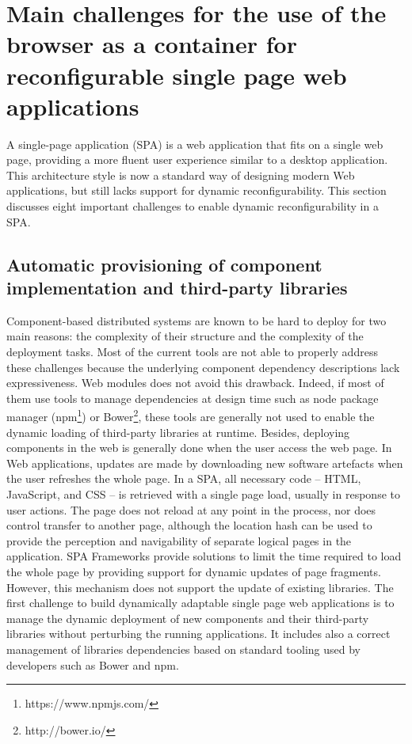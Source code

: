 \section{Main challenges for the use of the browser as a container for reconfigurable single page web applications }
A single-page application (SPA) is a web application that fits on a single web page, providing a more fluent user experience similar to a desktop application.
This architecture style is now a standard way of designing modern Web applications, but still lacks support for dynamic reconfigurability.
This section discusses eight important challenges to  enable dynamic reconfigurability in a SPA.

\subsection{Automatic provisioning of component implementation and third-party libraries}

Component-based distributed systems are known to be hard to deploy for two main reasons: the complexity of their structure and the complexity of the deployment tasks. Most of the current tools are not able to properly address these challenges because the underlying component dependency descriptions lack expressiveness. Web modules does not avoid this drawback. Indeed, if most of them use tools to manage dependencies at design time such as node package manager (npm\footnote{https://www.npmjs.com/}) or Bower\footnote{http://bower.io/}, these tools are generally not used to enable the dynamic loading of third-party libraries at runtime. Besides, deploying components in the web is generally done when the user access the web page. In Web applications, updates are made by downloading new software artefacts when the user refreshes the whole page. In a SPA, all necessary code -- HTML, JavaScript, and CSS -- is retrieved with a single page load, usually in response to user actions. The page does not reload at any point in the process, nor does control transfer to another page, although the location hash can be used to provide the perception and navigability of separate logical pages in the application. SPA Frameworks provide solutions to limit the time required to load the whole page by providing support for dynamic updates of page fragments. However, this mechanism does not support the update of existing libraries. The first challenge to build dynamically adaptable single page web applications is to manage the dynamic deployment of new components and their third-party libraries without perturbing the running applications. It includes also a correct management of libraries dependencies based on standard tooling used by developers such as Bower and npm.

